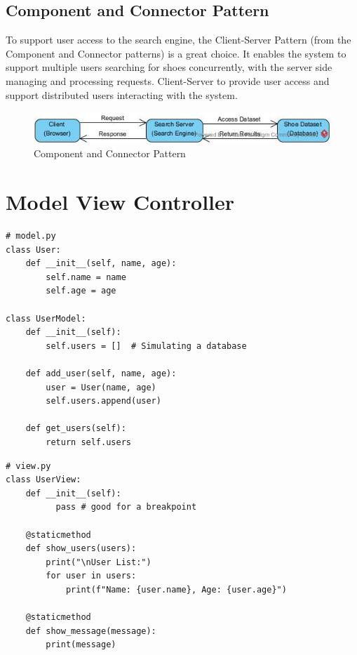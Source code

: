 \subsection{Component and Connector Pattern}
To support user access to the search engine, the Client-Server Pattern (from the Component and Connector patterns) is a great choice. It enables the system to support multiple users searching for shoes concurrently, with the server side managing and processing requests. Client-Server to provide user access and support distributed users interacting with the system.

\begin{figure}[h]
    \centering
    \includegraphics[scale=0.7]{Book-SSW565/jpg/ArchitecturePatterns/Component and Connector Pattern.jpg}
    \caption{\label{Figure::Component and Connector Pattern}Component and Connector Pattern}
\end{figure}

\section{Model View Controller}
\begin{lstlisting}[caption=model.py]
# model.py
class User:
    def __init__(self, name, age):
        self.name = name
        self.age = age

class UserModel:
    def __init__(self):
        self.users = []  # Simulating a database

    def add_user(self, name, age):
        user = User(name, age)
        self.users.append(user)

    def get_users(self):
        return self.users
\end{lstlisting}
\begin{lstlisting}[caption=view.py]
# view.py
class UserView:
    def __init__(self):
          pass # good for a breakpoint

    @staticmethod
    def show_users(users):
        print("\nUser List:")
        for user in users:
            print(f"Name: {user.name}, Age: {user.age}")

    @staticmethod
    def show_message(message):
        print(message)
\end{lstlisting}

